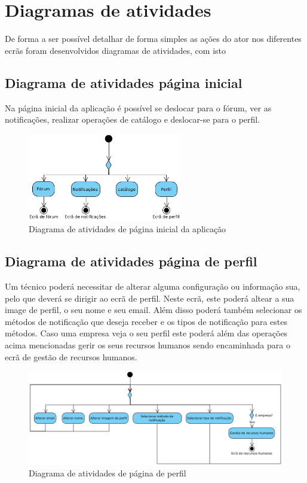 \section{Diagramas de atividades}
De forma a ser possível detalhar de forma simples as ações do ator nos diferentes ecrãs foram 
desenvolvidos diagramas de atividades, com isto 

\subsection{Diagrama de atividades página inicial}

Na página inicial da aplicação é possível se deslocar para o fórum, ver as notificações, realizar operações
de catálogo e deslocar-se para o perfil.

\begin{figure}[htb]
    \centering
    \includegraphics[width=0.6\textwidth]{images/diagramas/atividades/diagrama_atividades_home.png}
    \caption{Diagrama de atividades de página inicial da aplicação}
    \label{fig:34}
\end{figure}

\subsection{Diagrama de atividades página de perfil}

Um técnico poderá necessitar de alterar alguma configuração ou informação sua, pelo que deverá se dirigir
ao ecrã de perfil. Neste ecrã, este poderá altear a sua image de perfil, o seu nome e seu email. 
Além disso poderá também selecionar os métodos de notificação que deseja receber e os tipos de notificação
para estes métodos. Caso uma empresa veja o seu perfil este poderá além das operações acima mencionadas
gerir os seus recursos humanos sendo encaminhada para o ecrã de gestão de recursos humanos.

\begin{figure}[htb]
    \centering
    \includegraphics[width=\textwidth]{images/diagramas/atividades/diagrama_atividades_perfil.png}
    \caption{Diagrama de atividades de página de perfil}
    \label{fig:35}
\end{figure}


